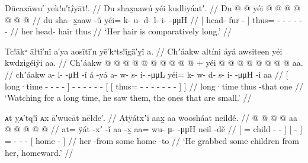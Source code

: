\ex\label{ex:94-4-hair-long}%
%
\begingl
	\glpreamble	Dūcaxāwu′ yek!u′ʟ̣îyāt!. //
	\glpreamble	Du shax̱aawú yéi kudliyáatʼ. //
	\gla	{} Du  @ {} @ {} {} 
		yéi @  @ {} @ {} @ {} @ {} @ {} @ {} //
	\glb	{} du sha- x̱aaw -ǔ {}
		yéi= k- u- d- l- i-  -μμH //
	\glc	{}[  head- fur - {}]
		thus= - - - - -  - //
	\gld	{} her head- hair {} {}
		thus  {} {} {} {} {} {} //
	\glft	‘Her hair is comparatively long.’
		//
\endgl
\xe

\ex\label{ex:94-5-watching-long-saw-small-ones}%
%
\begingl
	\glpreamble	Tc!ākᵘ āłtî′nî a′ya aosītī′n yē′kᵘts!îgā′ỵî a. //
	\glpreamble	Chʼáakw altíni áyá awsiteen yéi kwdzigéiÿi aa. //
	\gla	{} Chʼáakw  @ {} @ {} @ {} @ {} {}
			 @ {}
		 @ {} @ {} @ {} @ {} @ {} +
		{} {} yéi @  @ {} @ {} @ {} @ {} @ {} @ {} @ {} {} aa. {} //
	\glb	{} chʼáakw a- l-  -μH -ǐ {}
			á -yá
		a- w- s- i-  -μμL
		{} {} yéi= k- w- d- s- i-  -μμH -i {}
			aa {} //
	\glc	{}[ long·time - -  - - {}]
			 -
		- - - -  -
		{}[ {}[ thus= - - - - -
			 - - {}]
			 {}] //
	\gld	{} long·time  {} {} {} {} {}
			 {}
		 {} {} {} {} {}
		{} {} thus  {} {} {} {} {} {} -that {}
			one {} //
	\glft	‘Watching for a long time, he saw them, the ones that are small.’
		//
\endgl
\xe


\ex\label{ex:94-6-grab-some-kids-home}%
%
\begingl
	\glpreamble	ᴀt ỵᴀ′tq!î ᴀx ā′wucāt nēłde′. //
	\glpreamble	Atÿátxʼi aax̱ aa woosháat neildé. //
	\gla	{}  @ {} @ {} @ {} {}
		{}  @ {} {}
		aa @  @ {} @ {} @ {}
		{}  @ {} {} //
	\glb	{} at= ÿát -xʼ -ǐ {}
		{} aa -x̱ {}
		aa= wu- μ-  -μμH
		{} neil -dě {} //
	\glc	{}[ = child - - {}]
		{}[  - {}]
		= - -  -
		{}[ home - {}] //
	\gld	{}  {} {} {} {}
		{} her -from {}
		some  {} {} {}
		{} home -to {} //
	\glft	‘He grabbed some children from her, homeward.’
		//
\endgl
\xe


